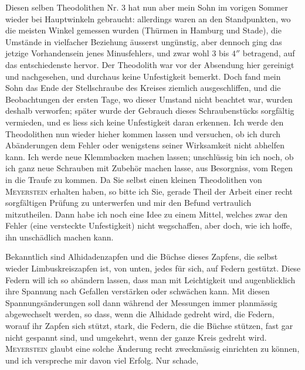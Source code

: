 \par\noindent\hspace*{\parindent}Diesen selben Theodolithen Nr. 3 hat nun aber mein Sohn im vorigen Sommer wieder bei Hauptwinkeln gebraucht: allerdings waren an den Standpunkten, wo die meisten Winkel gemessen wurden (Thürmen in Hamburg und Stade), die Umstände in vielfacher Beziehung äusserst ungünstig, aber dennoch ging das jetzige Vorhandensein jenes Minusfehlers, und zwar wohl 3 bis $4''$ betragend, auf das entschiedenste hervor. Der Theodolith war vor der Absendung hier gereinigt und nachgesehen, und durchaus keine Unfestigkeit bemerkt. Doch fand mein Sohn das Ende der Stellschraube des Kreises ziemlich ausgeschliffen, und die Beobachtungen der ersten Tage, wo dieser Umstand nicht beachtet war, wurden deshalb verworfen; später wurde der Gebrauch dieses Schraubenstücks sorgfältig vermieden, und es liess sich keine Unfestigkeit daran erkennen. Ich werde den Theodolithen nun wieder hieher kommen lassen und versuchen, ob ich durch Abänderungen dem Fehler oder wenigstens seiner Wirksamkeit nicht abhelfen kann. Ich werde neue Klemmbacken machen lassen; unschlüssig bin ich noch, ob ich ganz neue Schrauben mit Zubehör machen lasse, aus Besorgniss, vom Regen in die Traufe zu kommen. Da Sie selbst einen kleinen Theodolithen von \textsc{Meyerstein} erhalten haben, so bitte ich Sie, gerade  Theil der Arbeit einer recht sorgfältigen Prüfung zu unterwerfen und mir den Befund vertraulich mitzutheilen. Dann habe ich noch eine Idee zu einem Mittel, welches zwar den Fehler (eine versteckte Unfestigkeit) nicht wegschaffen, aber doch, wie ich hoffe, ihn unschädlich machen kann.

\par\noindent\hspace*{\parindent}Bekanntlich sind Alhidadenzapfen und die Büchse dieses Zapfens, die selbst wieder Limbuskreiszapfen ist, von unten, jedes für sich, auf Federn gestützt. Diese Federn will ich so abändern lassen, dass man mit Leichtigkeit und augenblicklich ihre Spannung nach Gefallen verstärken oder schwächen kann. Mit diesen Spannungsänderungen soll dann während der Messungen immer planmässig abgewechselt werden, so dass, wenn die Alhidade gedreht wird, die Federn, worauf ihr Zapfen sich stützt, stark, die Federn, die die Büchse stützen, fast gar nicht gespannt sind, und umgekehrt, wenn der ganze Kreis gedreht wird. \textsc{Meyerstein} glaubt eine solche Änderung recht zweckmässig einrichten zu können, und ich verspreche mir davon viel Erfolg. Nur schade,
\par\medskip\noindent{}\par
